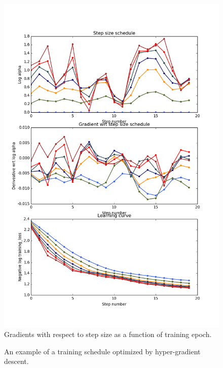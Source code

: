 \documentclass{article}
\begin{document}
\begin{figure}[ht]
\vskip 0.2in
\begin{center}
\centerline{\includegraphics[width=\columnwidth]{../experiments/Jan_15_optimize_learning_rate_schedule/2/fig.png}}
\caption{Gradients with respect to step size as a function of training epoch.}
\label{fig:chaos}
\end{center}
\vskip -0.2in
\end{figure} 


\begin{figure}[ht]
\vskip 0.2in
\begin{center}
\caption{An example of a training schedule optimized by hyper-gradient descent.}
\label{fig:optimal schedule}
\end{center}
\vskip -0.2in
\end{figure} 
\end{document}
